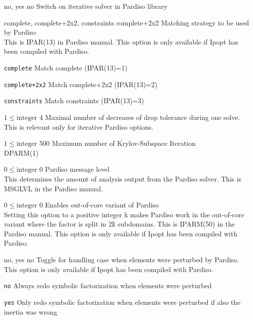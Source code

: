 %
{\ttfamily no, yes}%
{no}%
{Switch on iterative solver in Pardiso library}%
{}

%
{\ttfamily complete, complete+2x2, constraints}%
{complete+2x2}%
{Matching strategy to be used by Pardiso\\
This is IPAR(13) in Pardiso manual.  This option is only available if Ipopt has been compiled with Pardiso.}%
{\begin{list}{}{
\setlength{\parsep}{0em}
\setlength{\leftmargin}{5ex}
\setlength{\labelwidth}{2ex}
\setlength{\itemindent}{0ex}
\setlength{\topsep}{0pt}}
\item[\texttt{complete}] Match complete (IPAR(13)=1)
\item[\texttt{complete+2x2}] Match complete+2x2 (IPAR(13)=2)
\item[\texttt{constraints}] Match constraints (IPAR(13)=3)
\end{list}
}

%
{$1\leq\textrm{integer}$}%
{$4$}%
{Maximal number of decreases of drop tolerance during one solve.\\
This is relevant only for iterative Pardiso options.}%
{}

%
{$1\leq\textrm{integer}$}%
{$500$}%
{Maximum number of Krylov-Subspace Iteration\\
DPARM(1)}%
{}

%
{$0\leq\textrm{integer}$}%
{$0$}%
{Pardiso message level\\
This determines the amount of analysis output from the Pardiso solver. This is MSGLVL in the Pardiso manual.}%
{}

%
{$0\leq\textrm{integer}$}%
{$0$}%
{Enables out-of-core variant of Pardiso\\
Setting this option to a positive integer k makes Pardiso work in the out-of-core variant where the factor is split in 2\^k subdomains.  This is IPARM(50) in the Pardiso manual.  This option is only available if Ipopt has been compiled with Pardiso.}%
{}

%
{\ttfamily no, yes}%
{no}%
{Toggle for handling case when elements were perturbed by Pardiso.\\
This option is only available if Ipopt has been compiled with Pardiso.}%
{\begin{list}{}{
\setlength{\parsep}{0em}
\setlength{\leftmargin}{5ex}
\setlength{\labelwidth}{2ex}
\setlength{\itemindent}{0ex}
\setlength{\topsep}{0pt}}
\item[\texttt{no}] Always redo symbolic factorization when elements were perturbed
\item[\texttt{yes}] Only redo symbolic factorization when elements were perturbed if also the inertia was wrong
\end{list}
}

